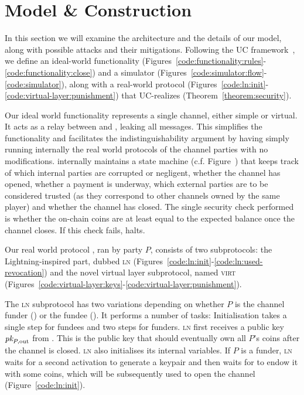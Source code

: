 \section{Model \& Construction}
  In this section we will examine the architecture and the details of our model,
  along with possible attacks and their mitigations. Following the UC
  framework~\cite{uc}, we define an ideal-world functionality \fchan
  (Figures~\ref{code:functionality:rules}-\ref{code:functionality:close}) and a
  simulator \simulator (Figures~\ref{code:simulator:flow}-\ref{code:simulator}),
  along with a real-world protocol \pchan
  (Figures~\ref{code:ln:init}-\ref{code:virtual-layer:punishment}) that
  UC-realizes \fchan (Theorem~\ref{theorem:security}).

  Our ideal world functionality \fchan represents a single channel, either
  simple or virtual. It acts as a relay between \adversary and \environment,
  leaking all messages. This simplifies the functionality and facilitates the
  indistinguishability argument by having \simulator simply running internally
  the real world protocols of the channel parties \pchan with no modifications.
  \fchan internally maintains a state machine (c.f. Figure~)
  that keeps track of which internal parties are corrupted or negligent, whether
  the channel has opened, whether a payment is underway, which external parties
  are to be considered trusted (as they correspond to other channels owned by
  the same player) and whether the channel has closed. The single security check
  performed is whether the on-chain coins are at least equal to the expected
  balance once the channel closes. If this check fails, \fchan halts.

  Our real world protocol \pchan, ran by party $P$, consists of two
  subprotocols: the Lightning-inspired part, dubbed \textsc{ln}
  (Figures~\ref{code:ln:init}-\ref{code:ln:used-revocation}) and the novel
  virtual layer subprotocol, named \textsc{virt}
  (Figures~\ref{code:virtual-layer:keys}-\ref{code:virtual-layer:punishment}).

  The \textsc{ln} subprotocol has two variations depending on whether $P$ is the
  channel funder (\alice) or the fundee (\bob). It performs a number of tasks:
  Initialisation takes a single step for fundees and two steps for funders.
  \textsc{ln} first receives a public key $\textit{pk}_{P, \mathrm{out}}$ from
  \environment. This is the public key that should eventually own all $P$'s
  coins after the channel is closed. \textsc{ln} also initialises its internal
  variables. If $P$ is a funder, \textsc{ln} waits for a second activation to
  generate a keypair and then waits for \environment to endow it with some
  coins, which will be subsequently used to open the channel
  (Figure~\ref{code:ln:init}).

